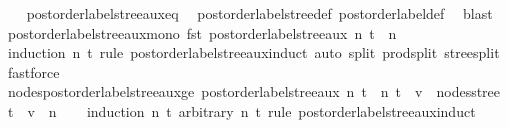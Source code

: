 \begin{isabellebody}
%
\isadelimproof
\ \ %
\endisadelimproof
%
\isatagproof
{}\isamarkupfalse%
\ postorder{\isacharunderscore}{\kern0pt}label{\isacharunderscore}{\kern0pt}stree{\isacharunderscore}{\kern0pt}aux{\isacharunderscore}{\kern0pt}eq\ \isamarkupfalse%
\ postorder{\isacharunderscore}{\kern0pt}label{\isacharunderscore}{\kern0pt}stree{\isacharunderscore}{\kern0pt}def\ postorder{\isacharunderscore}{\kern0pt}label{\isacharunderscore}{\kern0pt}def\ \isamarkupfalse%
\ blast%
\endisatagproof
{\isafoldproof}%
%
\isadelimproof
\isanewline
%
\endisadelimproof
\isanewline
{}\isamarkupfalse%
\ postorder{\isacharunderscore}{\kern0pt}label{\isacharunderscore}{\kern0pt}stree{\isacharunderscore}{\kern0pt}aux{\isacharunderscore}{\kern0pt}mono{\isacharcolon}{\kern0pt}\ {\isachardoublequoteopen}fst\ {\isacharparenleft}{\kern0pt}postorder{\isacharunderscore}{\kern0pt}label{\isacharunderscore}{\kern0pt}stree{\isacharunderscore}{\kern0pt}aux\ n\ t{\isacharparenright}{\kern0pt}\ {\isasymge}\ n{\isachardoublequoteclose}\isanewline
%
\isadelimproof
\ \ %
\endisadelimproof
%
\isatagproof
{}\isamarkupfalse%
\ {\isacharparenleft}{\kern0pt}induction\ n\ t\ rule{\isacharcolon}{\kern0pt}\ postorder{\isacharunderscore}{\kern0pt}label{\isacharunderscore}{\kern0pt}stree{\isacharunderscore}{\kern0pt}aux{\isachardot}{\kern0pt}induct{\isacharparenright}{\kern0pt}\ {\isacharparenleft}{\kern0pt}auto\ split{\isacharcolon}{\kern0pt}\ prod{\isachardot}{\kern0pt}split\ stree{\isachardot}{\kern0pt}split{\isacharcomma}{\kern0pt}\ fastforce{\isacharparenright}{\kern0pt}%
\endisatagproof
{\isafoldproof}%
%
\isadelimproof
\isanewline
%
\endisadelimproof
\isanewline
{}\isamarkupfalse%
\ nodes{\isacharunderscore}{\kern0pt}postorder{\isacharunderscore}{\kern0pt}label{\isacharunderscore}{\kern0pt}stree{\isacharunderscore}{\kern0pt}aux{\isacharunderscore}{\kern0pt}ge{\isacharcolon}{\kern0pt}\ {\isachardoublequoteopen}postorder{\isacharunderscore}{\kern0pt}label{\isacharunderscore}{\kern0pt}stree{\isacharunderscore}{\kern0pt}aux\ n\ t\ {\isacharequal}{\kern0pt}\ {\isacharparenleft}{\kern0pt}n{\isacharprime}{\kern0pt}{\isacharcomma}{\kern0pt}\ t{\isacharprime}{\kern0pt}{\isacharparenright}{\kern0pt}\ {\isasymLongrightarrow}\ v\ {\isasymin}\ nodes{\isacharunderscore}{\kern0pt}stree\ t{\isacharprime}{\kern0pt}\ {\isasymLongrightarrow}\ v\ {\isasymge}\ n{\isachardoublequoteclose}\isanewline
%
\isadelimproof
\ \ %
\endisadelimproof
%
\isatagproof
{}\isamarkupfalse%
\ {\isacharparenleft}{\kern0pt}induction\ n\ t\ arbitrary{\isacharcolon}{\kern0pt}\ n{\isacharprime}{\kern0pt}\ t{\isacharprime}{\kern0pt}\ rule{\isacharcolon}{\kern0pt}\ postorder{\isacharunderscore}{\kern0pt}label{\isacharunderscore}{\kern0pt}stree{\isacharunderscore}{\kern0pt}aux{\isachardot}{\kern0pt}induct{\isacharcomma}{\kern0pt}\isanewline

\end{isabellebody}
